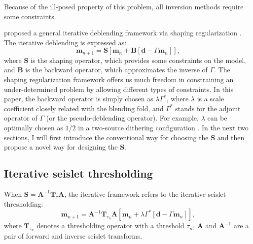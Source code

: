 
Because of the ill-posed property of this problem, all inversion methods require some constraints. 

\cite{yangkang20142} proposed a general iterative deblending framework via shaping regularization \cite{fomel2007shape,fomel2008nonshape}. The iterative deblending is expressed as:
\begin{equation}
\label{eq:iter}
\mathbf{m}_{n+1} = \mathbf{S}[\mathbf{m}_n+\mathbf{B}[\mathbf{d}-\Gamma\mathbf{m}_n]],
\end{equation}
where $\mathbf{S}$ is the shaping operator, which provides some constraints on the model, and $\mathbf{B}$ is the backward operator, which approximates the inverse of $\Gamma$. The shaping regularization framework offers us much freedom in constraining an under-determined problem by allowing different types of constraints.  In this paper, the backward operator is simply chosen as $\lambda\Gamma^*$, where $\lambda$ is a scale coefficient closely related with the blending fold, and $\Gamma^*$ stands for the adjoint operator of $\Gamma$ (or the pseudo-deblending operator). For example, $\lambda$ can be optimally chosen as $1/2$ in a two-source dithering configuration \cite{yangkang20142,arazthesis}. In the next two sections, I will first introduce the conventional way for choosing the $\mathbf{S}$ and then propose a novel way for designing the $\mathbf{S}$. 

\subsection{Iterative seislet thresholding}
When $\mathbf{S}=\mathbf{A}^{-1}\mathbf{T}_{\tau}\mathbf{A}$, the iterative framework refers to the iterative seislet thresholding:
\begin{equation}
\label{eq:seis}
\mathbf{m}_{n+1} = \mathbf{A}^{-1}\mathbf{T}_{\tau_n}\mathbf{A}[\mathbf{m}_n+\lambda\Gamma^*[\mathbf{d}-\Gamma\mathbf{m}_n]],
\end{equation}
where $\mathbf{T}_{\tau_n}$ denotes a thresholding operator with a threshold $\tau_n$, $\mathbf{A}$ and $\mathbf{A}^{-1}$ are a pair of forward and inverse seislet transforms. 

